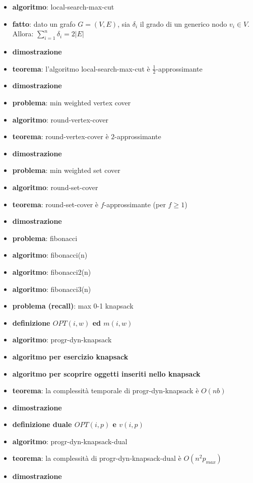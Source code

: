     \begin{itemize}

\item
  \textbf{algoritmo}: local-search-max-cut
\item
  \textbf{fatto}: dato un grafo \(G=(V,E)\), sia \(\delta_i\) il grado
  di un generico nodo \(v_i \in V\). Allora:
  \(\sum_{i=1}^{n} \delta_i = 2 |E|\)
\item
  \textbf{dimostrazione}
\item
  \textbf{teorema}: l'algoritmo local-search-max-cut è
  \({\frac{1}{2}}\)-approssimante
\item
  \textbf{dimostrazione}
\end{itemize}

    \begin{itemize}

\item
  \textbf{problema}: min weighted vertex cover
\item
  \textbf{algoritmo}: round-vertex-cover
\item
  \textbf{teorema}: round-vertex-cover è \(2\)-approssimante
\item
  \textbf{dimostrazione}
\item
  \textbf{problema}: min weighted set cover
\item
  \textbf{algoritmo}: round-set-cover
\item
  \textbf{teorema}: round-set-cover è \(f\)-approssimante (per
  \(f \geq 1\))
\item
  \textbf{dimostrazione}
\end{itemize}

    \begin{itemize}

\item
  \textbf{problema}: fibonacci
\item
  \textbf{algoritmo}: fibonacci(n)
\item
  \textbf{algoritmo}: fibonacci2(n)
\item
  \textbf{algoritmo}: fibonacci3(n)
\item
  \textbf{problema (recall)}: max 0-1 knapsack
\item
  \textbf{definizione \(OPT(i,w)\) ed \(m(i,w)\)}
\item
  \textbf{algoritmo}: progr-dyn-knapsack
\item
  \textbf{algoritmo per esercizio knapsack}
\item
  \textbf{algoritmo per scoprire oggetti inseriti nello knapsack}
\item
  \textbf{teorema}: la complessità temporale di progr-dyn-knapsack è
  \(O(nb)\)
\item
  \textbf{dimostrazione}
\item
  \textbf{definizione duale \(OPT(i,p)\) e \(v(i,p)\)}
\item
  \textbf{algoritmo}: progr-dyn-knapsack-dual
\item
  \textbf{teorema}: la complessità di progr-dyn-knapsack-dual è
  \(O(n^2p_{max})\)
\item
  \textbf{dimostrazione}
\end{itemize}

